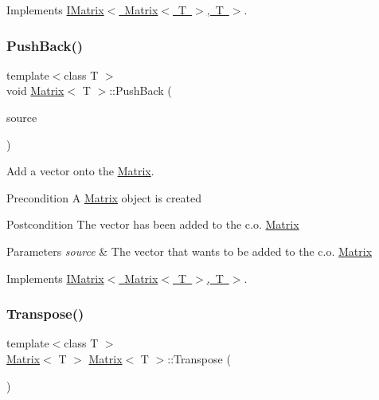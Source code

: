 Implements \mbox{\hyperlink{class_i_matrix}{I\+Matrix$<$ Matrix$<$ T $>$, T $>$}}.

\mbox{\label{class_matrix_af61aaa671b6bd354b27fb3aabbb65a9d}} 
\subsubsection{\texorpdfstring{PushBack()}{PushBack()}}
{\footnotesize\ttfamily template$<$class T $>$ \\
void \mbox{\hyperlink{class_matrix}{Matrix}}$<$ T $>$\+::Push\+Back (\begin{DoxyParamCaption}\item[{const \mbox{\hyperlink{class_my_vector}{My\+Vector}}$<$ T $>$ \&}]{source }\end{DoxyParamCaption})\hspace{0.3cm}{\ttfamily [virtual]}}



Add a vector onto the \mbox{\hyperlink{class_matrix}{Matrix}}. 

\begin{DoxyPrecond}{Precondition}
A \mbox{\hyperlink{class_matrix}{Matrix}} object is created 
\end{DoxyPrecond}
\begin{DoxyPostcond}{Postcondition}
The vector has been added to the c.\+o. \mbox{\hyperlink{class_matrix}{Matrix}}
\end{DoxyPostcond}

\begin{DoxyParams}{Parameters}
{\em source} & The vector that wants to be added to the c.\+o. \mbox{\hyperlink{class_matrix}{Matrix}} \\
\hline
\end{DoxyParams}


Implements \mbox{\hyperlink{class_i_matrix}{I\+Matrix$<$ Matrix$<$ T $>$, T $>$}}.

\mbox{\label{class_matrix_a86d55a5db43b641f4e8fb2b302ccc599}} 
\subsubsection{\texorpdfstring{Transpose()}{Transpose()}}
{\footnotesize\ttfamily template$<$class T $>$ \\
\mbox{\hyperlink{class_matrix}{Matrix}}$<$ T $>$ \mbox{\hyperlink{class_matrix}{Matrix}}$<$ T $>$\+::Transpose (\begin{DoxyParamCaption}{ }\end{DoxyParamCaption})}



